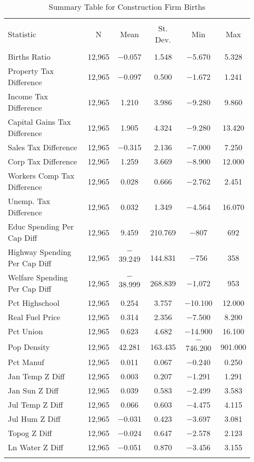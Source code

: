 
\begin{table}[!htbp] \centering 
  \caption{Summary Table for  Construction Firm Births} 
  \label{23summary} 
\begin{tabular}{@{\extracolsep{5pt}}lccccc} 
\\[-1.8ex]\hline 
\hline \\[-1.8ex] 
Statistic & \multicolumn{1}{c}{N} & \multicolumn{1}{c}{Mean} & \multicolumn{1}{c}{St. Dev.} & \multicolumn{1}{c}{Min} & \multicolumn{1}{c}{Max} \\ 
\hline \\[-1.8ex] 
Births Ratio & 12,965 & $-$0.057 & 1.548 & $-$5.670 & 5.328 \\ 
Property Tax Difference & 12,965 & $-$0.097 & 0.500 & $-$1.672 & 1.241 \\ 
Income Tax Difference & 12,965 & 1.210 & 3.986 & $-$9.280 & 9.860 \\ 
Capital Gains Tax Difference & 12,965 & 1.905 & 4.324 & $-$9.280 & 13.420 \\ 
Sales Tax Difference & 12,965 & $-$0.315 & 2.136 & $-$7.000 & 7.250 \\ 
Corp Tax Difference & 12,965 & 1.259 & 3.669 & $-$8.900 & 12.000 \\ 
Workers Comp Tax Difference & 12,965 & 0.028 & 0.666 & $-$2.762 & 2.451 \\ 
Unemp. Tax Difference & 12,965 & 0.032 & 1.349 & $-$4.564 & 16.070 \\ 
Educ Spending Per Cap Diff & 12,965 & 9.459 & 210.769 & $-$807 & 692 \\ 
Highway Spending Per Cap Diff & 12,965 & $-$39.249 & 144.831 & $-$756 & 358 \\ 
Welfare Spending Per Cap Diff & 12,965 & $-$38.999 & 268.839 & $-$1,072 & 953 \\ 
Pct Highschool & 12,965 & 0.254 & 3.757 & $-$10.100 & 12.000 \\ 
Real Fuel Price & 12,965 & 0.314 & 2.356 & $-$7.500 & 8.200 \\ 
Pct Union & 12,965 & 0.623 & 4.682 & $-$14.900 & 16.100 \\ 
Pop Density & 12,965 & 42.281 & 163.435 & $-$746.200 & 901.000 \\ 
Pct Manuf & 12,965 & 0.011 & 0.067 & $-$0.240 & 0.250 \\ 
Jan Temp Z Diff & 12,965 & 0.003 & 0.207 & $-$1.291 & 1.291 \\ 
Jan Sun Z Diff & 12,965 & 0.039 & 0.583 & $-$2.499 & 3.583 \\ 
Jul Temp Z Diff & 12,965 & 0.066 & 0.603 & $-$4.475 & 4.115 \\ 
Jul Hum Z Diff & 12,965 & $-$0.031 & 0.423 & $-$3.697 & 3.081 \\ 
Topog Z Diff & 12,965 & $-$0.024 & 0.647 & $-$2.578 & 2.123 \\ 
Ln Water Z Diff & 12,965 & $-$0.051 & 0.870 & $-$3.456 & 3.155 \\ 
\hline \\[-1.8ex] 
\end{tabular} 
\end{table} 
